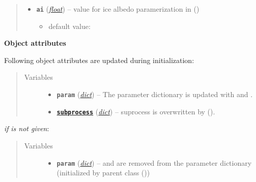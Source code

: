 \documentclass[a4paper,10pt,english]{sphinxmanual}
\begin{document}
\begin{fulllineitems}
\begin{quote}
\begin{description}
\begin{itemize}
\begin{itemize}
\end{itemize}


\item {} 
\textbf{\texttt{ai}} (\href{http://docs.python.org/2.7/library/functions.html\#float}{\emph{float}}) -- 
value for ice albedo paramerization in
{\hyperref[api/climlab.surface:climlab.surface.albedo.StepFunctionAlbedo]{\emph{}}} ()
\begin{itemize}
\item {} 
default value: 

\end{itemize}


\end{itemize}

\end{description}\end{quote}

\textbf{Object attributes}

Following object attributes are updated during initialization:
\begin{quote}\begin{description}
\item[{Variables}] \leavevmode\begin{itemize}
\item {} 
\textbf{\texttt{param}} (\href{http://docs.python.org/2.7/library/stdtypes.html\#dict}{\emph{dict}}) -- The parameter dictionary is updated with 
 and .

\item {} 
\href{http://docs.python.org/2.7/library/subprocess.html\#module-subprocess}{\textbf{\texttt{subprocess}}} (\href{http://docs.python.org/2.7/library/stdtypes.html\#dict}{\emph{dict}}) -- suprocess  is overwritten by
{\hyperref[api/climlab.radiation:climlab.radiation.insolation.DailyInsolation]{\emph{}}} ().

\end{itemize}

\end{description}\end{quote}

\emph{if}  \emph{is not given}:
\begin{quote}\begin{description}
\item[{Variables}] \leavevmode\begin{itemize}
\item {} 
\textbf{\texttt{param}} (\href{http://docs.python.org/2.7/library/stdtypes.html\#dict}{\emph{dict}}) --  and  are removed from the 
parameter dictionary (initialized by parent class
{\hyperref[api/climlab.model:climlab.model.ebm.EBM]{\emph{}}} ())


\end{itemize}
\end{description}
\end{quote}
\end{fulllineitems}
\end{document}
